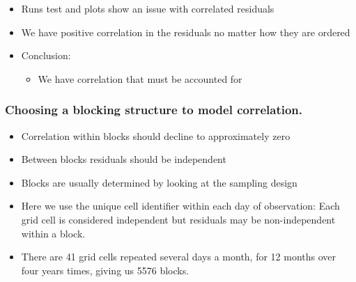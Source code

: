 \begin{frame}
\begin{itemize}
\item Runs test and plots show an issue with correlated residuals
\item We have positive correlation in the residuals no matter how they are ordered
\bigskip
\item Conclusion:  
\begin{itemize}
  \item We have correlation that must be accounted for
\end{itemize}
\end{itemize}
\end{frame}

\begin{frame}
\frametitle{Choosing a blocking structure to model correlation.}
\begin{itemize}
\item Correlation within blocks should decline to approximately zero 
\item Between blocks residuals should be independent
\item Blocks are usually determined by looking at the sampling design
\item Here we use the unique cell identifier within each day of observation: Each grid cell is considered independent but residuals may be non-independent within a block.
\item There are 41 grid cells repeated several days a month, for 12 months over four years times, giving us 5576 blocks.
\end{itemize}
\end{frame}


